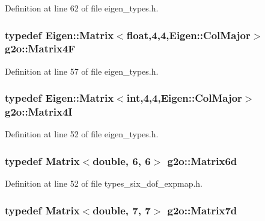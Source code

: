 Definition at line 62 of file eigen\+\_\+types.\+h.

\subsubsection[{\texorpdfstring{Matrix4F}{Matrix4F}}]{\setlength{\rightskip}{0pt plus 5cm}typedef Eigen\+::\+Matrix$<$float,4,4,Eigen\+::\+Col\+Major$>$ {\bf g2o\+::\+Matrix4F}}\hypertarget{namespaceg2o_afe979d0d6b88b375b29c06eb49df71fb}{}\label{namespaceg2o_afe979d0d6b88b375b29c06eb49df71fb}


Definition at line 57 of file eigen\+\_\+types.\+h.

\subsubsection[{\texorpdfstring{Matrix4I}{Matrix4I}}]{\setlength{\rightskip}{0pt plus 5cm}typedef Eigen\+::\+Matrix$<$int,4,4,Eigen\+::\+Col\+Major$>$ {\bf g2o\+::\+Matrix4I}}\hypertarget{namespaceg2o_a10216d68ff0555e64c628cf7f5f3bb7a}{}\label{namespaceg2o_a10216d68ff0555e64c628cf7f5f3bb7a}


Definition at line 52 of file eigen\+\_\+types.\+h.

\subsubsection[{\texorpdfstring{Matrix6d}{Matrix6d}}]{\setlength{\rightskip}{0pt plus 5cm}typedef Matrix$<$double, 6, 6$>$ {\bf g2o\+::\+Matrix6d}}\hypertarget{namespaceg2o_afff8bcc18e5be58eef0961900ddda24b}{}\label{namespaceg2o_afff8bcc18e5be58eef0961900ddda24b}


Definition at line 52 of file types\+\_\+six\+\_\+dof\+\_\+expmap.\+h.

\subsubsection[{\texorpdfstring{Matrix7d}{Matrix7d}}]{\setlength{\rightskip}{0pt plus 5cm}typedef Matrix$<$double, 7, 7$>$ {\bf g2o\+::\+Matrix7d}}\hypertarget{namespaceg2o_a3ce3dfdcb313ec3483b8cee099402e54}{}\label{namespaceg2o_a3ce3dfdcb313ec3483b8cee099402e54}


